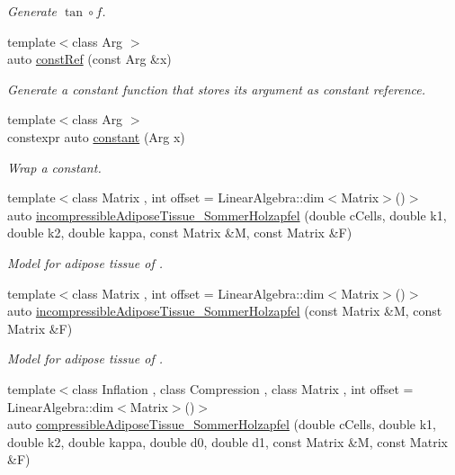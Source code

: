 \begin{DoxyCompactItemize}
\begin{DoxyCompactList}\small\item\em Generate $ \tan\circ f $. \end{DoxyCompactList}\item 
{\footnotesize template$<$class Arg $>$ }\\auto \hyperlink{namespacefuncy_a5b53fb968a94a7c6535601fa15b1fc88}{const\-Ref} (const Arg \&x)
\begin{DoxyCompactList}\small\item\em Generate a constant function that stores its argument as constant reference. \end{DoxyCompactList}\item 
{\footnotesize template$<$class Arg $>$ }\\constexpr auto \hyperlink{namespacefuncy_a46d594fc5323b9427a530af323a9ca71}{constant} (Arg x)
\begin{DoxyCompactList}\small\item\em Wrap a constant. \end{DoxyCompactList}\item 
{\footnotesize template$<$class Matrix , int offset = Linear\-Algebra\-::dim$<$\-Matrix$>$()$>$ }\\auto \hyperlink{group__Biomechanics_ga36560a89b598664a05bbf66db532e6fc}{incompressible\-Adipose\-Tissue\-\_\-\-Sommer\-Holzapfel} (double c\-Cells, double k1, double k2, double kappa, const Matrix \&M, const Matrix \&F)
\begin{DoxyCompactList}\small\item\em Model for adipose tissue of \cite{Sommer2013}. \end{DoxyCompactList}\item 
{\footnotesize template$<$class Matrix , int offset = Linear\-Algebra\-::dim$<$\-Matrix$>$()$>$ }\\auto \hyperlink{group__Biomechanics_gad6b4e5cb05913af7dac9f7d854709ea1}{incompressible\-Adipose\-Tissue\-\_\-\-Sommer\-Holzapfel} (const Matrix \&M, const Matrix \&F)
\begin{DoxyCompactList}\small\item\em Model for adipose tissue of \cite{Sommer2013}. \end{DoxyCompactList}\item 
{\footnotesize template$<$class Inflation , class Compression , class Matrix , int offset = Linear\-Algebra\-::dim$<$\-Matrix$>$()$>$ }\\auto \hyperlink{group__Biomechanics_ga264309c6dd9f2a888a058bbe28545cad}{compressible\-Adipose\-Tissue\-\_\-\-Sommer\-Holzapfel} (double c\-Cells, double k1, double k2, double kappa, double d0, double d1, const Matrix \&M, const Matrix \&F)

\end{DoxyCompactItemize}
